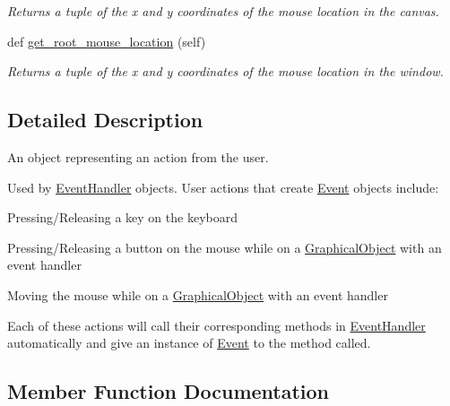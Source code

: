 \begin{DoxyCompactItemize}
\begin{DoxyCompactList}\small\item\em Returns a tuple of the x and y coordinates of the mouse location in the canvas. \end{DoxyCompactList}\item 
def \mbox{\hyperlink{classcs110graphics__v2_1_1Event_a138c802fe5378ed103a8c090b7435f4c}{get\+\_\+root\+\_\+mouse\+\_\+location}} (self)
\begin{DoxyCompactList}\small\item\em Returns a tuple of the x and y coordinates of the mouse location in the window. \end{DoxyCompactList}\end{DoxyCompactItemize}


\subsection{Detailed Description}
An object representing an action from the user. 

Used by \mbox{\hyperlink{classcs110graphics__v2_1_1EventHandler}{Event\+Handler}} objects. User actions that create \mbox{\hyperlink{classcs110graphics__v2_1_1Event}{Event}} objects include\+:
\begin{DoxyItemize}
\item Pressing/\+Releasing a key on the keyboard
\item Pressing/\+Releasing a button on the mouse while on a \mbox{\hyperlink{classcs110graphics__v2_1_1GraphicalObject}{Graphical\+Object}} with an event handler
\item Moving the mouse while on a \mbox{\hyperlink{classcs110graphics__v2_1_1GraphicalObject}{Graphical\+Object}} with an event handler
\end{DoxyItemize}

Each of these actions will call their corresponding methods in \mbox{\hyperlink{classcs110graphics__v2_1_1EventHandler}{Event\+Handler}} automatically and give an instance of \mbox{\hyperlink{classcs110graphics__v2_1_1Event}{Event}} to the method called. 

\subsection{Member Function Documentation}
\mbox{\label{classcs110graphics__v2_1_1Event_a15a375ef26543e332aa34410c8695679}} 
